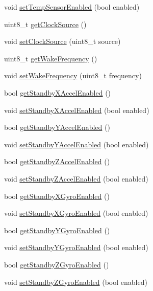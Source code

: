 \begin{DoxyCompactItemize}
void \mbox{\hyperlink{classMPU6050_a0113871802e88c80fe69ce1f607987ff}{set\+Temp\+Sensor\+Enabled}} (bool enabled)
\item 
uint8\+\_\+t \mbox{\hyperlink{classMPU6050_a8ed670258a805807b5102cdc5d0996a8}{get\+Clock\+Source}} ()
\item 
void \mbox{\hyperlink{classMPU6050_a4c1cd147d038e024bdeaa053c4d77734}{set\+Clock\+Source}} (uint8\+\_\+t source)
\item 
uint8\+\_\+t \mbox{\hyperlink{classMPU6050_a249a905ae4572a462414f2d94236258a}{get\+Wake\+Frequency}} ()
\item 
void \mbox{\hyperlink{classMPU6050_a62495e89f4787e6b18f0f795cef2b7cd}{set\+Wake\+Frequency}} (uint8\+\_\+t frequency)
\item 
bool \mbox{\hyperlink{classMPU6050_a99261a04739fdb7a9a1c5b67ce3e710e}{get\+Standby\+X\+Accel\+Enabled}} ()
\item 
void \mbox{\hyperlink{classMPU6050_af4df87fd2e87f41d06706cfd5bbc2a2c}{set\+Standby\+X\+Accel\+Enabled}} (bool enabled)
\item 
bool \mbox{\hyperlink{classMPU6050_a104f2ec438d745f8fdeec202bae09b48}{get\+Standby\+Y\+Accel\+Enabled}} ()
\item 
void \mbox{\hyperlink{classMPU6050_a7ce7d3299479eb66518acf0697132835}{set\+Standby\+Y\+Accel\+Enabled}} (bool enabled)
\item 
bool \mbox{\hyperlink{classMPU6050_adae85612e047c4c7f0c3b7110fc92956}{get\+Standby\+Z\+Accel\+Enabled}} ()
\item 
void \mbox{\hyperlink{classMPU6050_ac5fd917549d2ed0f12b8a17167271199}{set\+Standby\+Z\+Accel\+Enabled}} (bool enabled)
\item 
bool \mbox{\hyperlink{classMPU6050_acb5fde4167aa54fbbe84706d577a48a6}{get\+Standby\+X\+Gyro\+Enabled}} ()
\item 
void \mbox{\hyperlink{classMPU6050_ac1c6d8f623a9ca00a4ddc50f6615b977}{set\+Standby\+X\+Gyro\+Enabled}} (bool enabled)
\item 
bool \mbox{\hyperlink{classMPU6050_aaad2985f8d22aec123f1e1dabcdd427a}{get\+Standby\+Y\+Gyro\+Enabled}} ()
\item 
void \mbox{\hyperlink{classMPU6050_ab0973d64b7132188539b07991f7ea1f0}{set\+Standby\+Y\+Gyro\+Enabled}} (bool enabled)
\item 
bool \mbox{\hyperlink{classMPU6050_a20f7804db1a980a3c425ae44c33d420b}{get\+Standby\+Z\+Gyro\+Enabled}} ()
\item 
void \mbox{\hyperlink{classMPU6050_ada7c8a873fe157703dcdc08e25b48e32}{set\+Standby\+Z\+Gyro\+Enabled}} (bool enabled)

\end{DoxyCompactItemize}
